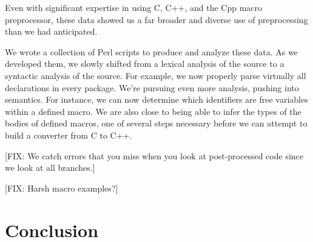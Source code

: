 Even with significant expertise in using C, C++, and the Cpp macro
preprocessor, these data showed us a far broader and diverse use of
preprocessing than we had anticipated.  

We wrote a collection of Perl scripts to produce and analyze these
data.  As we developed them, we slowly shifted from a lexical analysis
of the source to a syntactic analysis of the source.  For example, we
now properly parse virtually all declarations in every package.  We're
pursuing even more analysis, pushing into semantics.  For instance, we
can now determine which identifiers are free variables within a defined
macro.  We are also close to being able to infer the types of the bodies
of defined macros, one of several steps necessary before we can attempt
to build a converter from C to C++.

[FIX: We catch errors that you miss when you look at post-processed code
since we look at all branches.]

[FIX: Harsh macro examples?]

\section{Conclusion}\label{sec:conclusion}

\small 


